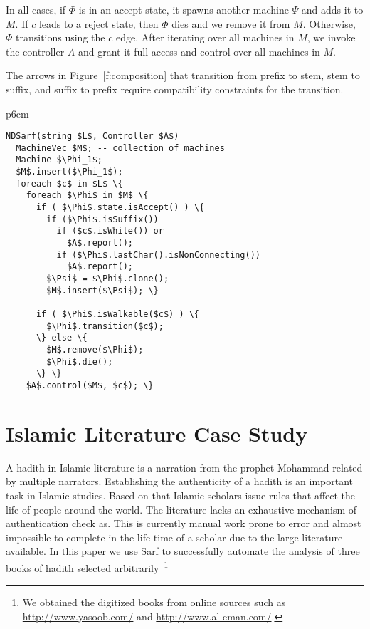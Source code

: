 \documentclass[11pt]{article}
\begin{document}
In all cases, if $\Phi$ is in an accept state, 
it spawns another machine $\Psi$ and adds it to $M$. 
If $c$ leads to a reject state, then $\Phi$ dies 
and we remove it from $M$. 
Otherwise, $\Phi$ transitions using the $c$ edge.
After iterating over all machines in $M$, we invoke the 
controller $A$
and grant it full access and control over
all machines in $M$. 

The arrows in Figure~\ref{f:composition} that transition
from prefix to stem, stem to suffix, and suffix to prefix
require compatibility constraints for 
the transition.

\begin{table}[tb]
\centering
\begin{tabular} {p{6cm}}
\begin{Verbatim}[fontsize=\relsize{-1},
frame=topline,framesep=4mm,label=\fbox{NDSarf algorithm},
commandchars=\\\{\}, codes={\catcode`$=3\catcode`_=8}]
NDSarf(string $L$, Controller $A$) 
  MachineVec $M$; -- collection of machines
  Machine $\Phi_1$;
  $M$.insert($\Phi_1$);
  foreach $c$ in $L$ \{
    foreach $\Phi$ in $M$ \{
      if ( $\Phi$.state.isAccept() ) \{
        if ($\Phi$.isSuffix())
          if ($c$.isWhite()) or 
            $A$.report();
          if ($\Phi$.lastChar().isNonConnecting())
            $A$.report();
        $\Psi$ = $\Phi$.clone();
        $M$.insert($\Psi$); \}

      if ( $\Phi$.isWalkable($c$) ) \{
        $\Phi$.transition($c$);
      \} else \{
        $M$.remove($\Phi$);
        $\Phi$.die();
      \} \} 
    $A$.control($M$, $c$); \}
\end{Verbatim}
\end{tabular}
\label{a:ndsarf}
\end{table}

\section{Islamic Literature Case Study}
\label{sec:islamic}

A hadith in Islamic literature is a narration from the prophet Mohammad
related by multiple narrators.
Establishing the authenticity of a hadith is an important task
in Islamic studies. 
Based on that Islamic scholars issue rules that affect the life
of people around the world. 
The literature lacks an exhaustive mechanism of authentication
check as. This is currently manual work prone to error and almost
impossible to complete in the life time of a scholar due to the
large literature available. 
In this paper we use Sarf to successfully automate the
analysis of three books of hadith selected 
arbitrarily~\cite{IbnHanbal,AlKulayni,AlTousi}\footnote{We obtained
  the digitized books from online sources such as 
  \href{http://www.yasoob.com/}{http://www.yasoob.com/} and 
  \href{http://www.al-eman.com/}{http://www.al-eman.com/}. }
\end{document}
